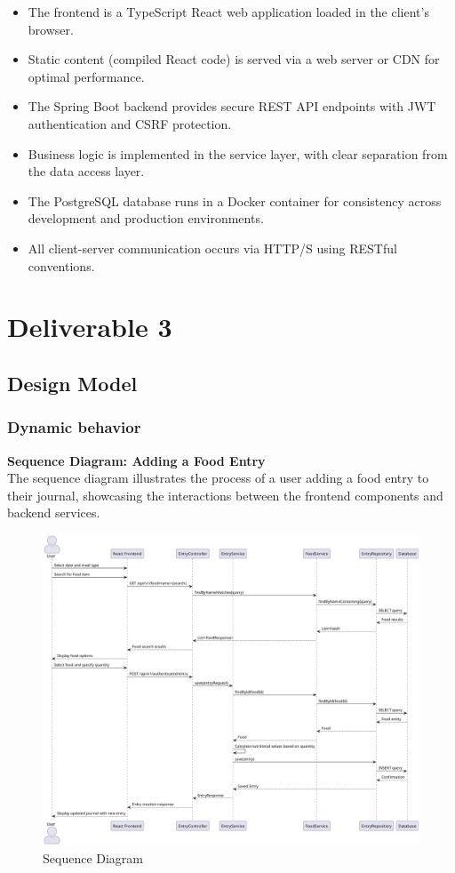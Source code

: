 \documentclass[a4paper,10pt]{article}
\begin{document}
            \begin{itemize}
                \item The frontend is a TypeScript React web application loaded in the client's browser.
                \item Static content (compiled React code) is served via a web server or CDN for optimal performance.
                \item The Spring Boot backend provides secure REST API endpoints with JWT authentication and CSRF protection.
                \item Business logic is implemented in the service layer, with clear separation from the data access layer.
                \item The PostgreSQL database runs in a Docker container for consistency across development and production environments.
                \item All client-server communication occurs via HTTP/S using RESTful conventions.
            \end{itemize}

\newpage
\section{Deliverable 3}
    \subsection{Design Model}
        \subsubsection{Dynamic behavior}
            \textbf{Sequence Diagram: Adding a Food Entry}\\
            The sequence diagram illustrates the process of a user adding a food entry to their journal, showcasing the interactions between the frontend components and backend services.

            \begin{figure}[h]
            \centering
            \includegraphics[width=1\textwidth]{sequence_1}
            \caption{Sequence Diagram}
            \end{figure}
\end{document}
